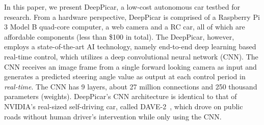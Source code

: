 

In this paper, we present DeepPicar, a low-cost autonomous car
testbed for research. From a hardware perspective,
DeepPicar is comprised of a Raspberry Pi 3 Model B quad-core
computer, a web camera and a RC car, all of which are affordable
components (less than \$100 in total).
The DeepPicar, however, employs a state-of-the-art AI
technology, namely end-to-end deep learning based real-time control,
which utilizes a deep convolutional neural network (CNN).
The CNN receives an image frame from a single forward
looking camera as input and generates a predicted steering angle
value as output at each control period in \emph{real-time}.
The CNN has 9 layers, about 27 million connections
and 250 thousand parameters (weights).
DeepPicar's CNN architecture is identical to that of NVIDIA's
real-sized self-driving car, called DAVE-2~\cite{Bojarski2016}, which
drove on public roads without human driver's intervention while only
using the CNN.



